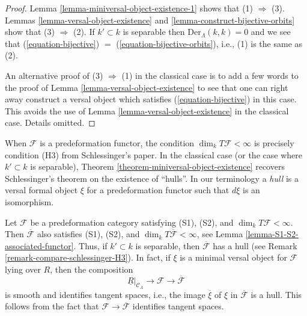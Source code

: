 \begin{proof}
Lemma \ref{lemma-miniversal-object-existence-1}
shows that (1) $\Rightarrow$ (3).
Lemmas \ref{lemma-versal-object-existence} and
\ref{lemma-construct-bijective-orbits}
show that (3) $\Rightarrow$ (2). If $k' \subset k$ is separable
then $\text{Der}_\Lambda(k, k) = 0$ and we see that
(\ref{equation-bijective}) $=$ (\ref{equation-bijective-orbits}), i.e.,
(1) is the same as (2).

\medskip\noindent
An alternative proof of (3) $\Rightarrow$ (1) in the classical case
is to add a few words to the proof of
Lemma \ref{lemma-versal-object-existence}
to see that one can right away construct a versal object which
satisfies (\ref{equation-bijective}) in this case. This avoids the use of
Lemma \ref{lemma-versal-object-existence}
in the classical case. Details omitted.
\end{proof}

\begin{remark}
\label{remark-compare-schlessinger-H3}
When $\mathcal{F}$ is a predeformation functor, the condition
$\dim_k T\mathcal{F} < \infty$ is precisely condition (H3) from
Schlessinger's paper. In the classical case (or the case where
$k' \subset k$ is separable),
Theorem \ref{theorem-miniversal-object-existence}
recovers Schlessinger's theorem on the existence of ``hulls''.
In our terminology a {\it hull} is a versal formal object $\xi$ for a
predeformation functor such that $d\xi$ is an isomorphism.
\end{remark}

\begin{remark}
\label{remark-compose-minimal-into-iso-classes}
Let $\mathcal{F}$ be a predeformation category satisfying
(S1), (S2), and $\dim_k T\mathcal{F} < \infty$.
Then $\overline{\mathcal{F}}$ also satisfies
(S1), (S2), and $\dim_k T\overline{\mathcal{F}} < \infty$, see
Lemma \ref{lemma-S1-S2-associated-functor}.
Thus, if $k' \subset k$ is separable, then $\overline{\mathcal{F}}$
has a hull (see Remark \ref{remark-compare-schlessinger-H3}).
In fact, if $\xi$ is a minimal versal object for $\mathcal{F}$
lying over $R$, then the composition
$$
\underline{R}|_{\mathcal{C}_\Lambda} \longrightarrow
\mathcal{F} \longrightarrow \overline{\mathcal{F}}
$$
is smooth and identifies tangent spaces, i.e., the image $\overline{\xi}$
of $\xi$ in $\overline{\mathcal{F}}$ is a hull. This follows from the fact that
$\mathcal{F} \to \overline{\mathcal{F}}$ identifies tangent spaces.
\end{remark}

